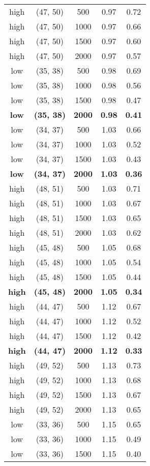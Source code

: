 \begin{tabular}{c c c c c}
high & (47, 50) &  500 & 0.97 & 0.72 \\
high & (47, 50) &  1000 & 0.97 & 0.66 \\
high & (47, 50) &  1500 & 0.97 & 0.60 \\
high & (47, 50) &  2000 & 0.97 & 0.57 \\
low & (35, 38) &  500 & 0.98 & 0.69 \\
low & (35, 38) &  1000 & 0.98 & 0.56 \\
low & (35, 38) &  1500 & 0.98 & 0.47 \\
\textbf{low} & \textbf{(35, 38)} & \textbf{ 2000} & \textbf{0.98} & \textbf{0.41} \\
low & (34, 37) &  500 & 1.03 & 0.66 \\
low & (34, 37) &  1000 & 1.03 & 0.52 \\
low & (34, 37) &  1500 & 1.03 & 0.43 \\
\textbf{low} & \textbf{(34, 37)} & \textbf{ 2000} & \textbf{1.03} & \textbf{0.36} \\
high & (48, 51) &  500 & 1.03 & 0.71 \\
high & (48, 51) &  1000 & 1.03 & 0.67 \\
high & (48, 51) &  1500 & 1.03 & 0.65 \\
high & (48, 51) &  2000 & 1.03 & 0.62 \\
high & (45, 48) &  500 & 1.05 & 0.68 \\
high & (45, 48) &  1000 & 1.05 & 0.54 \\
high & (45, 48) &  1500 & 1.05 & 0.44 \\
\textbf{high} & \textbf{(45, 48)} & \textbf{ 2000} & \textbf{1.05} & \textbf{0.34} \\
high & (44, 47) &  500 & 1.12 & 0.67 \\
high & (44, 47) &  1000 & 1.12 & 0.52 \\
high & (44, 47) &  1500 & 1.12 & 0.42 \\
\textbf{high} & \textbf{(44, 47)} & \textbf{ 2000} & \textbf{1.12} & \textbf{0.33} \\
high & (49, 52) &  500 & 1.13 & 0.73 \\
high & (49, 52) &  1000 & 1.13 & 0.68 \\
high & (49, 52) &  1500 & 1.13 & 0.67 \\
high & (49, 52) &  2000 & 1.13 & 0.65 \\
low & (33, 36) &  500 & 1.15 & 0.65 \\
low & (33, 36) &  1000 & 1.15 & 0.49 \\
low & (33, 36) &  1500 & 1.15 & 0.40 \\

\end{tabular}
